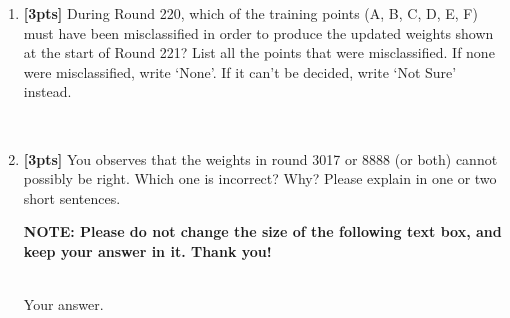 \begin{enumerate}
\begin{enumerate}
    \item \textbf{[3pts]} During Round 220, which of the training points (A, B, C, D, E, F) must have been misclassified in order to produce the updated weights shown at the start of Round 221? List all the points that were misclassified.  If none were misclassified, write `None'. If it can't be decided, write `Not Sure' instead.

    \begin{tcolorbox}[fit,height=1cm, width=6cm, blank, borderline={1pt}{-2pt},nobeforeafter]
    \end{tcolorbox}\\

    \item \textbf{[3pts]}  You observes that the weights in round 3017 or 8888 (or both) cannot possibly be right. Which one is incorrect? Why? Please explain in one or two short sentences.


    \textbf{NOTE: Please do not change the size of the following text box, and keep your answer in it. Thank you!} \\ \\
    \begin{tcolorbox}[fit,height=4cm, width=15cm, blank, borderline={1pt}{-2pt},nobeforeafter]
    \large
    Your answer.

    \end{tcolorbox} \\
    
    
    

\end{enumerate}
    
\end{enumerate}